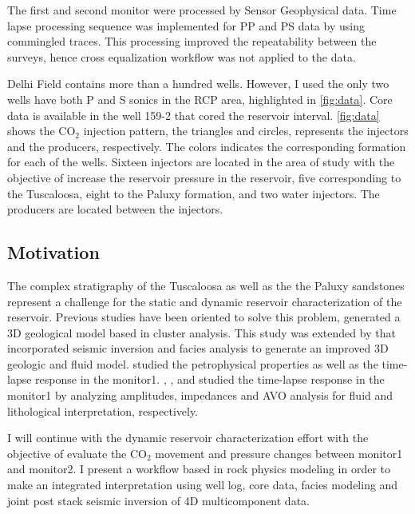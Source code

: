 The first and second monitor were processed by Sensor Geophysical data. 
Time lapse processing sequence was implemented for PP and PS data by 
using commingled traces. This processing improved the repeatability 
between the surveys, hence cross equalization workflow was not applied to the data. 

Delhi Field contains more than a hundred wells. However, I used the only two wells 
have  both P and S sonics in the RCP area, highlighted in \ref{fig:data}.
Core data is available in the well 159-2 that cored the reservoir interval. \ref{fig:data}
shows the CO$_2$ injection pattern, the triangles and circles, represents the 
injectors and the producers, respectively. The colors indicates the corresponding 
formation for each of the wells. Sixteen injectors are located in the area of study with
the objective of increase the reservoir pressure in the reservoir, 
five corresponding to the Tuscaloosa, eight to the Paluxy formation, and two water
injectors. The producers are located between the injectors.




\subsection{Motivation}

The complex stratigraphy of the Tuscaloosa as well as the the Paluxy
sandstones represent a challenge for the  static and dynamic reservoir 
characterization of the reservoir. Previous studies have been oriented
to solve this problem, \citep{ref:nick} generated a 3D geological model
based in cluster analysis. This study was extended by \citep{ref:doug} that 
incorporated seismic inversion and facies analysis to generate an improved
3D geologic and fluid model. \citep{ref:assem} studied the petrophysical properties
as well as the time-lapse response in the monitor1. \citep{ref:holly},
\citep{ref:julio}, and \citep{ref:ishan} studied the time-lapse response in the monitor1
by analyzing amplitudes, impedances and AVO analysis for fluid and lithological 
interpretation, respectively.

I will continue with the dynamic reservoir characterization effort with 
the objective of evaluate the CO$_2$ movement and pressure changes between 
monitor1 and monitor2. I present a workflow based in rock physics modeling 
in order to make an integrated interpretation using well log, core data, 
facies modeling and joint post stack seismic inversion of 4D multicomponent
data.

